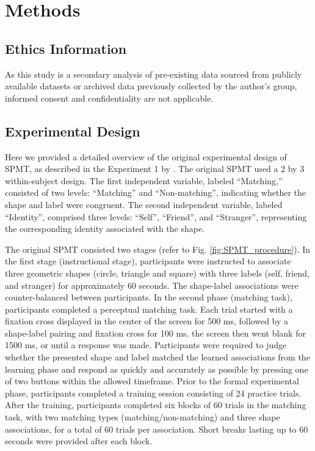 \documentclass[sn-apa]{sn-jnl}%
\theoremstyle{thmstyleone}%
\theoremstyle{thmstyletwo}%
\theoremstyle{thmstylethree}%
\begin{document}
\section{Methods}\label{sec:method}

\subsection{Ethics Information}\label{subsec:ethics}

As this study is a secondary analysis of pre-existing data sourced from publicly available datasets or archived data previously collected by the author's group, informed consent and confidentiality are not applicable.

\subsection{Experimental Design}\label{subsec:experimentdesign}

Here we provided a detailed overview of the original experimental design of SPMT, as described in the Experiment 1 by \textcite{sui2012perceptual}. The original SPMT used a 2 by 3 within-subject design. The first independent variable, labeled ``Matching,” consisted of two levels: ``Matching” and ``Non-matching”, indicating whether the shape and label were congruent. The second independent variable, labeled ``Identity”, comprised three levels: ``Self”, ``Friend”, and ``Stranger”, representing the corresponding identity associated with the shape.

The original SPMT consisted two stages (refer to Fig. \ref{fig:SPMT_procedure}). In the first stage (instructional stage), participants were instructed to associate three geometric shapes (circle, triangle and square) with three labels (self, friend, and stranger) for approximately 60 seconds. The shape-label associations were counter-balanced between participants. In the second phase (matching task), participants completed a perceptual matching task. Each trial started with a fixation cross displayed in the center of the screen for 500 ms, followed by a shape-label pairing and fixation cross for 100 ms. the screen then went blank for 1500 ms, or until a response was made. Participants were required to judge whether the presented shape and label matched the learned associations from the learning phase and respond as quickly and accurately as possible by pressing one of two buttons within the allowed timeframe. Prior to the formal experimental phase, participants completed a training session consisting of 24 practice trials. After the training, participants completed six blocks of 60 trials in the matching task, with two matching types (matching/non-matching) and three shape associations, for a total of 60 trials per association. Short breaks lasting up to 60 seconds were provided after each block.
 
\end{document}
